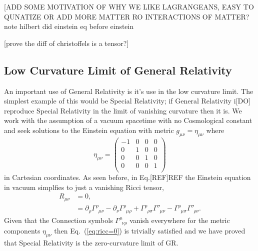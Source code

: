 [ADD SOME MOTIVATION OF WHY WE LIKE LAGRANGEANS, EASY TO QUNATIZE OR ADD MORE MATTER RO INTERACTIONS OF MATTER? note hilbert did einstein eq before einstein

[prove the diff of christoffels is a tensor?]

\subsection{Low Curvature Limit of General Relativity}
An important use of General Relativity is it's use in the low curvature limit. The simplest example of this would be Special Relativity; if General Relativity i[DO] reproduce Special Relativity in the limit of vanishing curvature then it is. We work with the assumption of a vacuum spacetime with no Cosmological constant and seek solutions to the Einstein equation with metric $g_{\mu\nu} = \eta_{\mu\nu}$ where 
\begin{equation}
\eta_{\mu\nu} = \begin{pmatrix} -1 & 0 & 0 & 0 \\ 0 & 1 & 0 & 0 \\ 0 & 0 & 1 & 0 \\ 0 & 0 & 0 & 1 \\\end{pmatrix}
\end{equation}
in Cartesian coordinates. As seen before, in Eq.[REF]REF the Einstein equation in vacuum simplfies to just a vanishing Ricci tensor,
\begin{align} \label{eq:ricc=0}
R_{\mu\nu} &= 0 ,\\
           &= \partial_{\rho}\Gamma^{\rho}_{\,\,\,\mu \nu}-\partial_{\nu}\Gamma^{\rho}_{\,\,\,\mu \rho} + \Gamma^{\rho}_{\,\,\, \rho\sigma}\Gamma^{\sigma}_{\,\,\,\mu \nu}-\Gamma^{\rho}_{\,\,\,\mu \sigma}\Gamma^{\sigma}_{\,\,\, \rho\nu}.
\end{align}
Given that the Connection symbols $\Gamma^\mu_{\,\,\,\nu\rho}$ vanish everywhere for the metric components ${\eta}_{\mu\nu}$ then Eq.~(\ref{eq:ricc=0}) is trivially satisfied and we have proved that Special Relativity is the zero-curvature limit of GR.


